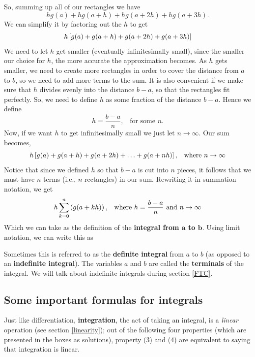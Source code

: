 So, summing up all of our rectangles we have
\[
hg(a) + hg(a+h) +  hg(a+2h) +  hg(a+3h).
\]
We can simplify it by factoring out the $h$ to get
\[
h\left[g(a) + g(a+h) +  g(a+2h) +  g(a+3h)\right]
\]
We need to let $h$ get smaller (eventually infinitesimally small), since the smaller our choice for $h$, the more accurate the approximation becomes. As $h$ gets smaller, we need to create more rectangles in order to cover the distance from $a$ to $b$, so we need to add more terms to the sum. It is also convenient if we make sure that $h$ divides evenly into the distance $b - a$, so that the rectangles fit perfectly. So, we need to define $h$ as some fraction of the distance $b - a$. Hence we define
\[
h = \frac{b-a}{n}, \;\;\; \text{for some $n$}.
\]
Now, if we want $h$ to get infinitesimally small we just let $n \rightarrow \infty$. Our sum becomes,
\[
h\left[g(a) + g(a+h) + g(a + 2h) + \ldots + g(a + nh)\right], \;\;\; \text{where $n \rightarrow \infty$}
\]
Notice that since we defined $h$ so that $b - a$ is cut into $n$ pieces, it follows that we must have $n$ terms (i.e., $n$ rectangles) in our sum. Rewriting it in summation notation, we get
\[
h\sum_{k = 0}^n\left(g(a+kh)\right), \;\;\; \text{where $h = \frac{b-a}{n}$ and $n \rightarrow \infty$}
\]
Which we can take as the definition of the \textbf{integral from $\boldsymbol{a}$ to $\boldsymbol{b}$}. Using limit notation, we can write this as \label{integral}

  	\bigskip
	
	\hfil{}
	\bigskip
	\bigskip

\noindent Sometimes this is referred to as the \textbf{definite integral} from $a$ to $b$ (as opposed to an \textbf{indefinite integral}). The variables $a$ and $b$ are called the \textbf{terminals} of the integral. We will talk about indefinite integrals during section \ref{FTC}. \label{terminals}

\subsection{Some important formulas for integrals} \label{integration}
Just like differentiation, \textbf{integration}, the act of taking an integral, is a \textit{linear} operation (see section \ref{linearity}); out of the following four properties (which are presented in the boxes as solutions), property (3) and (4) are equivalent to saying that integration is linear. \\

